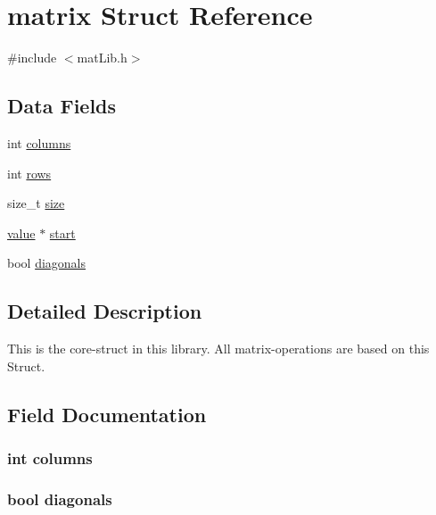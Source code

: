 \hypertarget{structmatrix}{}\section{matrix Struct Reference}
\label{structmatrix}


{\ttfamily \#include $<$mat\+Lib.\+h$>$}

\subsection*{Data Fields}
\begin{DoxyCompactItemize}
\item 
int \hyperlink{structmatrix_a341d2f00089fffc71eb6dbfd29f56c89}{columns}
\item 
int \hyperlink{structmatrix_a061459acc9e078fa4699e0e349887215}{rows}
\item 
size\+\_\+t \hyperlink{structmatrix_a854352f53b148adc24983a58a1866d66}{size}
\item 
\hyperlink{mat_lib_8h_a24f54d55d636a8405ad2cf062c3c9bee}{value} $\ast$ \hyperlink{structmatrix_a34f549255e7222691d5c0d1160ea26f1}{start}
\item 
bool \hyperlink{structmatrix_a364ca1611327dab86c8641beffd90b17}{diagonals}
\end{DoxyCompactItemize}


\subsection{Detailed Description}
This is the core-\/struct in this library. All matrix-\/operations are based on this Struct. 

\subsection{Field Documentation}
\hypertarget{structmatrix_a341d2f00089fffc71eb6dbfd29f56c89}{}
\subsubsection[{columns}]{\setlength{\rightskip}{0pt plus 5cm}int columns}\label{structmatrix_a341d2f00089fffc71eb6dbfd29f56c89}
\hypertarget{structmatrix_a364ca1611327dab86c8641beffd90b17}{}
\subsubsection[{diagonals}]{\setlength{\rightskip}{0pt plus 5cm}bool diagonals}\label{structmatrix_a364ca1611327dab86c8641beffd90b17}
\hypertarget{structmatrix_a061459acc9e078fa4699e0e349887215}{}
